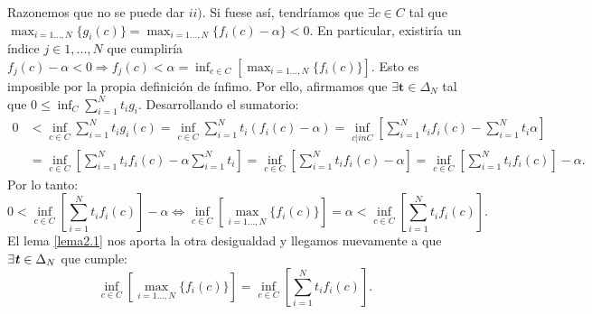 	Razonemos que no se puede dar $ ii) $. Si fuese así, tendríamos que $ \exists c \in C $ tal que $ \max_{i=1\dots,N } \{g_i(c)\} =  \max_{i=1\dots,N } \{f_i(c) - \alpha \} < 0 $. En particular, existiría un índice $ j \in {1,...,N} $ que cumpliría $ f_j(c) - \alpha < 0 \Longrightarrow f_j(c) < \alpha = \inf_{ c\in C}\left[\max_{i=1\dots,N } \{f_i(c)\} \right] $. Esto es imposible por la propia definición de ínfimo. Por ello, afirmamos que $ \exists \mathbf{t} \in \Delta_N $ tal que $ 0 \leq \inf_{C}  \sum_{i=1}^{N}{t_i g_i}$. Desarrollando el sumatorio:
	\begin{equation*}
	\begin{split}
	0 &< \inf_{c \in C}  \sum_{i=1}^{N}{t_i g_i (c)} = \inf_{c \in C}  \sum_{i=1}^{N}{t_i(f_i(c) - \alpha)} = \inf_{c |in C} \left[ \sum_{i=1}^{N}{t_i f_i(c)} - \sum_{i=1}^{N}{t_i\alpha} \right]\\
	&= \inf_{c \in C} \left[ \sum_{i=1}^{N}{t_i f_i(c)} -\alpha \sum_{i=1}^{N}{t_i} \right] = \inf_{c \in C} \left[ \sum_{i=1}^{N}{t_i f_i(c)} - \alpha \right] = \inf_{c \in C} \left[ \sum_{i=1}^{N}{t_i f_i(c)}\right] - \alpha.
	\end{split}
	\end{equation*}
	Por lo tanto:
	\[
	0 < \inf_{c \in C} \left[ \sum_{i=1}^{N}{t_i f_i(c)}\right] - \alpha \Longleftrightarrow \inf_{c \in C}\left[ \max_{i=1\dots,N } \{f_i(c)\}\right] = \alpha  < \inf_{c \in C} \left[ \sum_{i=1}^{N}{t_i f_i(c)}\right].
	\]
	El lema \ref{lema2.1} nos aporta la otra desigualdad y llegamos nuevamente a que $ \exists \textbf{\emph{t}} \in \Delta_N $ que cumple:
	\[
	\inf_{c \in C}\left[ \max_{i=1\dots,N } \{f_i(c)\}\right] = \inf_{c \in C} \left[ \sum_{i=1}^{N}{t_i f_i(c)}\right]. \]
	